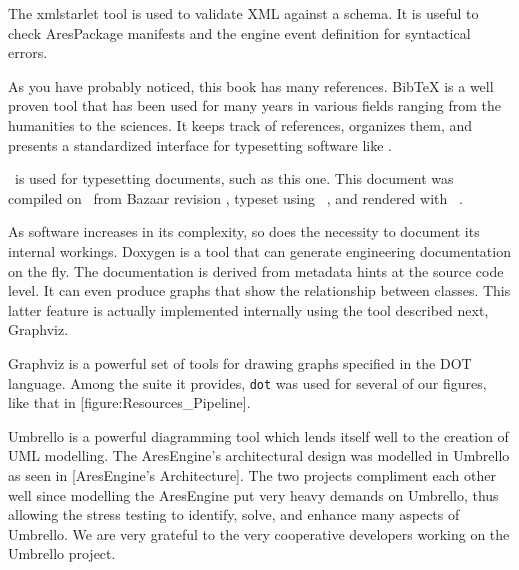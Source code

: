 
The xmlstarlet tool is used to validate XML against a schema. It is useful to check AresPackage manifests and the engine event definition for syntactical errors.
\stopitemize



\startitemize[4]

As you have probably noticed, this book has many references. BibTeX is a well proven tool that has been used for many years in various fields ranging from the humanities to the sciences. It keeps track of references, organizes them, and presents a standardized interface for typesetting software like \CONTEXT.

\head {\em \CONTEXT}

\CONTEXT\ is used for typesetting documents, such as this one. This document was compiled on \currentdate\ from Bazaar revision \BazaarRevision, typeset using \CONTEXT\ \contextversion, and rendered with \texenginename\ \texengineversion.


As software increases in its complexity, so does the necessity to document its internal workings. Doxygen is a tool that can generate engineering documentation on the fly. The documentation is derived from metadata hints at the source code level. It can even produce graphs that show the relationship between classes. This latter feature is actually implemented internally using the tool described next, Graphviz.


Graphviz is a powerful set of tools for drawing graphs specified in the DOT language. Among the suite it provides, {\tt dot} was used for several of our figures, like that in [figure:Resources_Pipeline].


Umbrello is a powerful diagramming tool which lends itself well to the creation of UML modelling. The AresEngine's architectural design was modelled in Umbrello as seen in [AresEngine's Architecture]. The two projects compliment each other well since modelling the AresEngine put very heavy demands on Umbrello, thus allowing the stress testing to identify, solve, and enhance many aspects of Umbrello. We are very grateful to the very cooperative developers working on the Umbrello project.
\stopitemize

